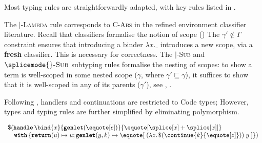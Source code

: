 Most typing rules are straightforwardly adapted, with key rules listed in . 

The \compilemode{}$\mid$\quotemode{}-\textsc{Lambda} rule corresponds to \textsc{C-Abs} in the refined environment classifier literature. Recall that classifiers formalise the notion of scope () The $\gamma' \notin \Gamma$ constraint ensures that introducing a binder $\lambda x.\_$ introduces a new scope, via a \textbf{fresh} classifier. This is necessary for correctness. The \compilemode{}$\mid$\quotemode{}\textsc{-Sub} and $\splicemode{}\textsc{-Sub}$ subtyping rules formalise the nesting of scopes: to show a term is well-scoped in some nested scope ($\gamma$, where $\gamma' \sqsubseteq \gamma$), it suffices to show that it is well-scoped in any of its parents ($\gamma'$), see , .

Following \citeauthor{isoda-24}, handlers and continuations are restricted to \textsf{Code} types; However, types and typing rules are further simplified by eliminating polymorphism. 

\begin{code} 
 \begin{source}
  $\begin{array}{l}
      \$(\textbf{\texttt{handle}} \, {\bind{x}{\textbf{\texttt{genlet}}(\equote[e])}{\equote[{\splice[x]} + {\splice[x]}]}} \\
      \quad \textbf{\texttt{with}} \, \{ \textbf{\texttt{return}}(u) \mapsto {u}; \textbf{\texttt{genlet}}(y, k) \mapsto {\equote[\; (\lambda z. \, \$(\continue{k}{\equote[z]})) \; y \;]}\})
    \end{array}$
 \end{source}
 \label{listing:refined-environment-classifiers-let-insertion}
\end{code}

